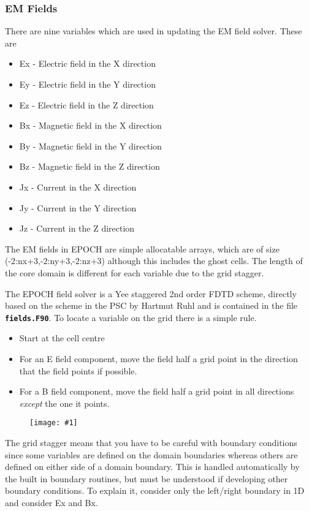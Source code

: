 \documentclass[12pt]{article}
\newcommand{\inlinecode}[1]{{\color{warwickred} \bf\texttt{#1}}}
\newcommand{\EPOCH}{{\color{warwickdark}\fontfamily{phv}\selectfont EPOCH} }
\newcommand{\image}[1]
  {{\begin{figure} \centering \texttt{[image: \#1]} \end{figure}}}
\begin{document}
\pagebreak

\subsubsection{EM Fields}
There are nine variables which are used in updating the EM field solver. These
are
\begin{itemize}
\item Ex - Electric field in the X direction
\item Ey - Electric field in the Y direction
\item Ez - Electric field in the Z direction
\item Bx - Magnetic field in the X direction
\item By - Magnetic field in the Y direction
\item Bz - Magnetic field in the Z direction
\item Jx - Current in the X direction
\item Jy - Current in the Y direction
\item Jz - Current in the Z direction
\end{itemize}
The EM fields in \EPOCH are simple allocatable arrays, which are of size
(-2:nx+3,-2:ny+3,-2:nz+3) although this includes the ghost cells. The length of
the core domain is different for each variable due to the grid stagger.

The \EPOCH field solver is a Yee staggered 2nd order FDTD scheme, directly
based on the scheme in the PSC by Hartmut Ruhl and is contained in the file
\inlinecode{fields.F90}. To locate a variable on the grid there is a simple
rule.
\begin{itemize}
\item Start at the cell centre
\item For an E field component, move the field half a grid point in the
  direction that the field points if possible.
\item For a B field component, move the field half a grid point in all
  directions {\it except} the one it points.
\end{itemize}

\image{./images/stagger.eps}

The grid stagger means that you have to be careful with boundary conditions
since some variables are defined on the domain boundaries whereas others are
defined on either side of a domain boundary. This is handled automatically by
the built in boundary routines, but must be understood if developing other
boundary conditions. To explain it, consider only the left/right boundary in 1D
and consider Ex and Bx.\\
\end{document}
